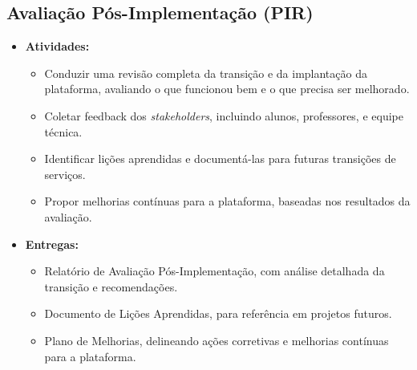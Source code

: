 \documentclass{article}
\begin{document}
\subsection{Avaliação Pós-Implementação (PIR)}
\begin{itemize}
    \item \textbf{Atividades:}
    \begin{itemize}
        \item Conduzir uma revisão completa da transição e da implantação da plataforma, avaliando o que funcionou bem e o que precisa ser melhorado.
        \item Coletar feedback dos \textit{stakeholders}, incluindo alunos, professores, e equipe técnica.
        \item Identificar lições aprendidas e documentá-las para futuras transições de serviços.
        \item Propor melhorias contínuas para a plataforma, baseadas nos resultados da avaliação.
    \end{itemize}
    \item \textbf{Entregas:}
    \begin{itemize}
        \item Relatório de Avaliação Pós-Implementação, com análise detalhada da transição e recomendações.
        \item Documento de Lições Aprendidas, para referência em projetos futuros.
        \item Plano de Melhorias, delineando ações corretivas e melhorias contínuas para a plataforma.
    \end{itemize}
\end{itemize}
\end{document}
